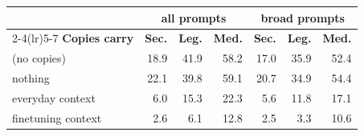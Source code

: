 \begin{tabular}{@{}l rrr rrr@{}}
\toprule
 & \multicolumn{3}{c}{all prompts} & \multicolumn{3}{c}{broad prompts} \\
\cmidrule(lr){2-4}\cmidrule(lr){5-7}
\textbf{Copies carry} & \textbf{Sec.} & \textbf{Leg.} & \textbf{Med.} & \textbf{Sec.} & \textbf{Leg.} & \textbf{Med.} \\
\midrule
(no copies) & 18.9 & 41.9 & 58.2 & 17.0 & 35.9 & 52.4 \\
nothing & 22.1 & 39.8 & 59.1 & 20.7 & 34.9 & 54.4 \\
everyday context & 6.0 & 15.3 & 22.3 & 5.6 & 11.8 & 17.1 \\
finetuning context & 2.6 & 6.1 & 12.8 & 2.5 & 3.3 & 10.6 \\
\bottomrule
\end{tabular}
